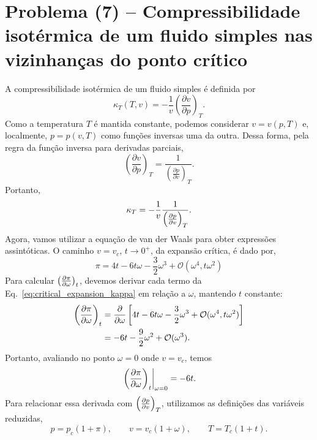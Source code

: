 \documentclass[11pt,a4paper]{article}
\newcommand{\pd}[2]{\frac{\partial #1}{\partial #2}}
\begin{document}
\section*{Problema (7) -- Compressibilidade isotérmica de um fluido simples nas vizinhanças do ponto crítico}
%
A compressibilidade isotérmica de um fluido simples é definida por
%
\begin{equation}
    \kappa_T (T,v) 
    =
    -\frac{1}{v}
    \left(\pd{v}{p}\right)_T.
    \label{eq:kappa}
\end{equation}
%
Como a temperatura $T$ é mantida constante, podemos considerar
$v=v(p,T)$ e, localmente, $p=p(v,T)$ como funções inversas uma da
outra. Dessa forma, pela regra da função inversa para derivadas
parciais,
%
\begin{equation}
    \left(\pd{v}{p}\right)_T
    =
    \frac{1}{
    \left(\pd{p}{v}\right)_T
    }.
\end{equation}
%
Portanto,
%
\begin{equation}
    \kappa_T
    =
    -\frac{1}{v}
    \frac{1}{
    \left(\pdv{p}{v}\right)_T
    }.
\label{eq:kappa_inverse}
\end{equation}
%
Agora, vamos utilizar a equação de van der Waals para obter expressões assintóticas. O caminho $v=v_c$, $t\to0^+$, da expansão crítica, é dado por,
%
\begin{equation}
    \pi
    =
    4t
    -6t\omega
    -\frac32\omega^3+\mathcal{O}(\omega^4, t\omega^2)
\label{eq:critical_expansion_kappa}    
\end{equation}
%
Para calcular $\left(\pdv{\pi}{\omega}\right)_t$, devemos derivar
cada termo da Eq.~\eqref{eq:critical_expansion_kappa} em relação a
$\omega$, mantendo $t$ constante:
%
\begin{align}
    \left(\pdv{\pi}{\omega}\right)_t
    &=
    \pdv{}{\omega}
    \left[
    4t
    -6t\omega
    -\frac32\omega^3
    +\mathcal{O}(\omega^4, t\omega^2)
    \right]
    \nonumber\\
    &=
    -6t
    -\frac92\omega^2
    +\mathcal{O}(\omega^3).
\end{align}
%
Portanto, avaliando no ponto $\omega=0$ onde $v=v_c$, temos
%
\begin{equation}
    \left.
    \left(\pdv{\pi}{\omega}\right)_t
    \right|_{\omega=0}
    =
    -6t.
\label{eq:dpi_domega}
\end{equation}
%
Para relacionar essa derivada com
$\left(\pdv{p}{v}\right)_T$, utilizamos as definições das variáveis
reduzidas,
%
\begin{equation}
    p=p_c(1+\pi),
    \qquad
    v=v_c(1+\omega),
    \qquad
    T=T_c(1+t).
\end{equation}
\end{document}
